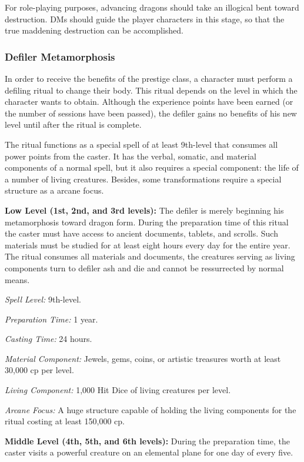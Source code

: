 {For role-playing purposes, advancing dragons should take an illogical bent toward destruction. DMs should guide the player characters in this stage, so that the true maddening destruction can be accomplished.

\subsubsection{Defiler Metamorphosis}
\label{Defiler Metamorphosis}

In order to receive the benefits of the prestige class, a character must perform a defiling ritual to change their body. This ritual depends on the level in which the character wants to obtain. Although the experience points have been earned (or the number of sessions have been passed), the defiler gains no benefits of his new level until after the ritual is complete.

The ritual functions as a special spell of at least 9th-level that consumes all power points from the caster. It has the verbal, somatic, and material components of a normal spell, but it also requires a special component: the life of a number of living creatures. Besides, some transformations require a special structure as a arcane focus.

\textbf{Low Level (1st, 2nd, and 3rd levels):} The defiler is merely beginning his metamorphosis toward dragon form. During the preparation time of this ritual the caster must have access to ancient documents, tablets, and scrolls. Such materials must be studied for at least eight hours every day for the entire year. The ritual consumes all materials and documents, the creatures serving as living components turn to defiler ash and die and cannot be ressurrected by normal means.

\textit{Spell Level:} 9th-level.

\textit{Preparation Time:} 1 year.

\textit{Casting Time:} 24 hours.

\textit{Material Component:} Jewels, gems, coins, or artistic treasures worth at least 30,000 cp per level.

\textit{Living Component:} 1,000 Hit Dice of living creatures per level.

\textit{Arcane Focus:} A huge structure capable of holding the living components for the ritual costing at least 150,000 cp.

\textbf{Middle Level (4th, 5th, and 6th levels):} During the preparation time, the caster visits a powerful creature on an elemental plane for one day of every five.

}

